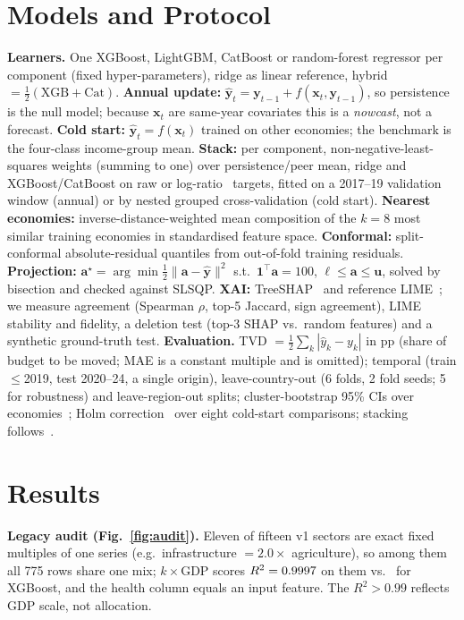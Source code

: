 \documentclass[conference]{IEEEtran}
\DeclareRobustCommand*{\_}{\textunderscore\hskip0pt\relax}
\begin{document}
\section{Models and Protocol}
\figArch
\textbf{Learners.} One XGBoost, LightGBM, CatBoost or random-forest regressor per component (fixed hyper-parameters), ridge as linear reference, hybrid $=\tfrac12(\text{XGB}+\text{Cat})$. \textbf{Annual update:} $\hat{\mathbf y}_t=\mathbf y_{t-1}+f(\mathbf x_t,\mathbf y_{t-1})$, so persistence is the null model; because $\mathbf x_t$ are same-year covariates this is a \emph{nowcast}, not a forecast. \textbf{Cold start:} $\hat{\mathbf y}_t=f(\mathbf x_t)$ trained on other economies; the benchmark is the four-class income-group mean. \textbf{Stack:} per component, non-negative-least-squares weights (summing to one) over persistence/peer mean, ridge and XGBoost/CatBoost on raw or log-ratio~\cite{aitchison1986,egozcue2003} targets, fitted on a 2017--19 validation window (annual) or by nested grouped cross-validation (cold start). \textbf{Nearest economies:} inverse-distance-weighted mean composition of the $k=8$ most similar training economies in standardised feature space. \textbf{Conformal:} split-conformal absolute-residual quantiles from out-of-fold training residuals. \textbf{Projection:} $\mathbf a^\star=\arg\min\tfrac12\|\mathbf a-\hat{\mathbf y}\|^2$ s.t.\ $\mathbf 1^{\!\top}\mathbf a=100$, $\boldsymbol\ell\le\mathbf a\le\mathbf u$, solved by bisection and checked against SLSQP. \textbf{XAI:} TreeSHAP~\cite{lundberg2020} and reference LIME~\cite{ribeiro2016}; we measure agreement (Spearman $\rho$, top-5 Jaccard, sign agreement), LIME stability and fidelity, a deletion test (top-3 SHAP vs.\ random features) and a synthetic ground-truth test. \textbf{Evaluation.} TVD $=\tfrac12\sum_k|\hat y_k-y_k|$ in pp (share of budget to be moved; MAE is a constant multiple and is omitted); temporal (train $\le$2019, test 2020--24, a single origin), leave-country-out (6 folds, 2 fold seeds; 5 for robustness) and leave-region-out splits; cluster-bootstrap 95\% CIs over economies~\cite{cameron2008}; Holm correction~\cite{holm1979} over eight cold-start comparisons; stacking follows~\cite{wolpert1992}.

\section{Results}
\textbf{Legacy audit (Fig.~\ref{fig:audit}).} Eleven of fifteen v1 sectors are exact fixed multiples of one series (e.g.\ infrastructure $=2.0\times$ agriculture), so among them all 775 rows share one mix; $k\times$GDP scores $R^2=0.9997$ on them vs.\ \LegXGBRConst{} for XGBoost, and the health column equals an input feature. The $R^2>0.99$ reflects GDP scale, not allocation.
\figAudit
\end{document}
